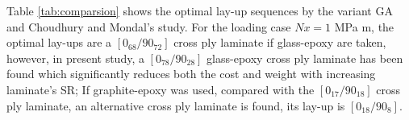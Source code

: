 
Table \ref{tab:comparsion} shows the optimal lay-up sequences by the variant GA
and  Choudhury and Mondal's\cite{choudhury2019failure} study. For the loading
case $Nx=1$ MPa m, the optimal lay-ups are a $[0_{68}/90_{72}]$  cross ply
laminate if glass-epoxy are taken, however,  in present study, a
$[0_{78}/90_{28}]$ glass-epoxy cross ply laminate has been found which
significantly reduces both the cost and weight with increasing laminate's SR;
If graphite-epoxy was used, compared with the $[0_{17}/90_{18}]$ cross ply
laminate, an alternative cross ply laminate is found, its lay-up is $[0_{18}/90_8]$.
